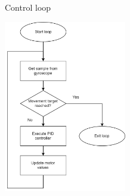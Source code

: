 \documentclass{beamer}
\begin{document}
\begin{frame}{Control loop}
	\begin{center}
		\includegraphics[width=0.4\textwidth]{pics/Flowchart_code.png}
	\end{center}
\end{frame}
\end{document}

